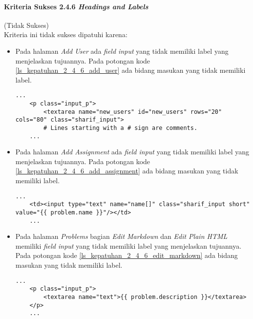 \paragraph{Kriteria Sukses 2.4.6 \textit{Headings and Labels}}
\label{subsubsec:kepatuhan_kriteria_2.4.6}
(Tidak Sukses) \\

Kriteria ini tidak sukses dipatuhi karena:
\begin{itemize}
	\item Pada halaman \textit{Add User} ada \textit{field input} yang tidak memiliki label yang menjelaskan tujuannya. Pada potongan kode \ref{ls_kepatuhan_2_4_6_add_user} ada bidang masukan yang tidak memiliki label.
	\begin{lstlisting}[basicstyle=\ttfamily, frame=single,
	columns=fullflexible, keepspaces=true, breaklines=true, label=ls_kepatuhan_2_4_6_add_user, caption=Pelanggaran Kriteria Sukses 2.4.6 - Halaman \textit{Add User} Tidak Memiliki Label]
	...
	<p class="input_p">
		<textarea name="new_users" id="new_users" rows="20" cols="80" class="sharif_input">
		# Lines starting with a # sign are comments.
	...
	\end{lstlisting}
	
	\item Pada halaman \textit{Add Assignment} ada \textit{field input} yang tidak memiliki label yang menjelaskan tujuannya. Pada potongan kode \ref{ls_kepatuhan_2_4_6_add_assignment} ada bidang masukan yang tidak memiliki label.
	\begin{lstlisting}[basicstyle=\ttfamily, frame=single,
	columns=fullflexible, keepspaces=true, breaklines=true, label=ls_kepatuhan_2_4_6_add_assignment, caption=Pelanggaran Kriteria Sukses 2.4.6 - Halaman \textit{Add Assignment} Tidak Memiliki Label]
	...
	<td><input type="text" name="name[]" class="sharif_input short" value="{{ problem.name }}"/></td>
	...
	\end{lstlisting}
	
	\item Pada halaman \textit{Problems} bagian \textit{Edit Markdown} dan \textit{Edit Plain HTML} memiliki \textit{field input} yang tidak memiliki label yang menjelaskan tujuannya. Pada potongan kode \ref{ls_kepatuhan_2_4_6_edit_markdown} ada bidang masukan yang tidak memiliki label.
	\begin{lstlisting}[basicstyle=\ttfamily, frame=single,
	columns=fullflexible, keepspaces=true, breaklines=true, label=ls_kepatuhan_2_4_6_edit_markdown, caption=Pelanggaran Kriteria Sukses 2.4.6 - Halaman \textit{Problems} bagian \textit{Edit Markdown} Tidak Memiliki Label]
	...
	<p class="input_p">
		<textarea name="text">{{ problem.description }}</textarea>
	</p>
	...
	\end{lstlisting}
	
\end{itemize}

